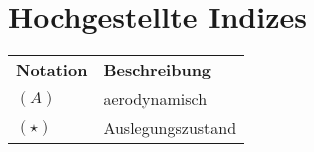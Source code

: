 \begin{longtable}{lp{13cm}}
\end{longtable}
%
\section*{Hochgestellte Indizes}
\begin{longtable}{lp{13cm}}
	\textbf{Notation} & \textbf{Beschreibung}\\
	\ensuremath{(A)}			& aerodynamisch \\
	\ensuremath{(\star)}		& Auslegungszustand 
	
	
	
\end{longtable}
%
\addtocounter{table}{-4}
